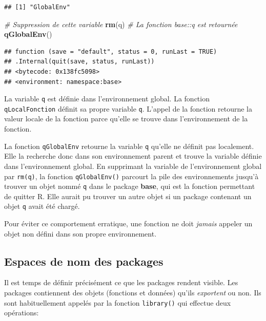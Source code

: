 \documentclass[
  12pt,
  french,
  a4paper,
  extrafontsizes,onecolumn,openright
  ]{memoir}
\newenvironment{Shaded}{\begin{snugshade}}{\end{snugshade}}
\newcommand{\CommentTok}[1]{\textcolor[rgb]{0.56,0.35,0.01}{\textit{#1}}}
\newcommand{\FunctionTok}[1]{\textcolor[rgb]{0.13,0.29,0.53}{\textbf{#1}}}
\newcommand{\NormalTok}[1]{#1}
\begin{document}
\begin{verbatim}
## [1] "GlobalEnv"
\end{verbatim}

\begin{Shaded}
\begin{Highlighting}[]
\CommentTok{\# Suppression de cette variable}
\FunctionTok{rm}\NormalTok{(q)}
\CommentTok{\# La fonction base::q est retournée}
\FunctionTok{qGlobalEnv}\NormalTok{()}
\end{Highlighting}
\end{Shaded}

\begin{verbatim}
## function (save = "default", status = 0, runLast = TRUE) 
## .Internal(quit(save, status, runLast))
## <bytecode: 0x138fc5098>
## <environment: namespace:base>
\end{verbatim}

\normalsize

La variable \texttt{q} est définie dans l'environnement global.
La fonction \texttt{qLocalFonction} définit sa propre variable \texttt{q}.
L'appel de la fonction retourne la valeur locale de la fonction parce qu'elle se trouve dans l'environnement de la fonction.

La fonction \texttt{qGlobalEnv} retourne la variable \texttt{q} qu'elle ne définit pas localement.
Elle la recherche donc dans son environnement parent et trouve la variable définie dans l'environnement global.
En supprimant la variable de l'environnement global par \texttt{rm(q)}, la fonction \texttt{qGlobalEnv()} parcourt la pile des environnements jusqu'à trouver un objet nommé \texttt{q} dans le package \textbf{base}, qui est la fonction permettant de quitter R.
Elle aurait pu trouver un autre objet si un package contenant un objet \texttt{q} avait été chargé.

Pour éviter ce comportement erratique, une fonction ne doit \emph{jamais} appeler un objet non défini dans son propre environnement.

\subsection{Espaces de nom des packages}\label{espaces-de-nom-des-packages}

Il est temps de définir précisément ce que les packages rendent visible.
Les packages contiennent des objets (fonctions et données) qu'ils \emph{exportent} ou non.
Ils sont habituellement appelés par la fonction \texttt{library()} qui effectue deux opérations:
\end{document}

